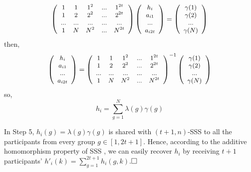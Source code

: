 \[
\small
\left(\begin{array}{ccccc}
	1 &    1 & 1^2 & ...  & 1^{2t} \\
	1 &    2 & 2^2 & ... & 2^{2t}\\
	... & ... & ... & ...& ...\\
	1 & N & N^2 & ... & N^{2t}\\
\end{array}\right)
\left(\begin{array}{c}
	h_i    \\
	a_{i1}    \\
	... \\
	a_{i2t} \\
\end{array}\right)
=
\left(\begin{array}{c}
	\gamma(1)    \\
	\gamma(2)    \\
	... \\
	\gamma(N) \\
\end{array}\right)
\]
then,
\[
\small
\left(\begin{array}{c}
	h_i    \\
	a_{i1}    \\
	... \\
	a_{i2t} \\
\end{array}\right)
=
\left(\begin{array}{ccccc}
	1 &    1 & 1^2 & ...  & 1^{2t} \\
	1 &    2 & 2^2 & ... & 2^{2t}\\
	... & ... & ... & ...& ...\\
	1 & N & N^2 & ... & N^{2t}\\
\end{array}\right)^{-1}
\left(\begin{array}{c}
	\gamma(1)    \\
	\gamma(2)    \\
	... \\
	\gamma(N) \\
\end{array}\right)
\]
so,
$$h_i=\sum_{g=1}^{N} \lambda(g)\gamma(g)$$

In Step 5, $h_i(g)=\lambda(g)\gamma(g)$ is shared with $(t+1,n)$-SSS to all the participants from every group $g \in [1, 2t+1]$. Hence, according to the additive homomorphism property of SSS \cite{shamir1979share}, we can easily recover $h_i$ by receiving $t+1$ participants'  $h'_i(k) = \sum_{g=1}^{2t+1} h_i(g, k)$.$\qed$

